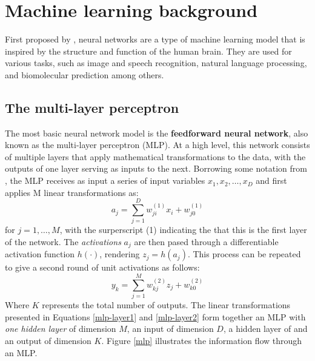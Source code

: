 \section{Machine learning background}
First proposed by \citet{rosenblatt1958}, neural networks are a type of machine learning model that is inspired by the structure and function of the human brain. 
They are used for various tasks, such as image and speech recognition, natural language processing, and biomolecular prediction among others.

\subsection{The multi-layer perceptron}
The most basic neural network model is the \textbf{feedforward neural network}, also known as the multi-layer perceptron (MLP). At a high level, this network consists of multiple layers that apply mathematical transformations to the data, with the outputs of one layer serving as inputs to the next. Borrowing some notation from \citet{bishop2006pattern}, the MLP receives as input a series of input variables $x_1, x_2, \dots, x_D$ and first applies M linear transformations as:
\begin{equation}
    a_j = \sum_{j=1}^D w_{ji}^{(1)}x_i + w_{j0}^{(1)}
\label{mlp-layer1}
\end{equation}
for $j = 1,\dots,M$, with the surperscript (1) indicating the that this is the first layer of the network. The \textit{activations} $a_j$ are then pased through a differentiable activation function $h(\cdot)$, rendering $z_j = h(a_j)$. This process can be repeated to give a second round of unit activations as follows:
\begin{equation}
    y_k = \sum_{j=1}^Mw_{kj}^{(2)}z_j + w_{k0}^{(2)}
\label{mlp-layer2}
\end{equation}
Where $K$ represents the total number of outputs. The linear transformations presented in Equations \ref{mlp-layer1} and \ref{mlp-layer2} form together an MLP with \textit{one hidden layer} of dimension $M$, an input of dimension $D$, a hidden layer of and an output of dimension $K$. Figure \ref{mlp} illustrates the information flow through an MLP. 
